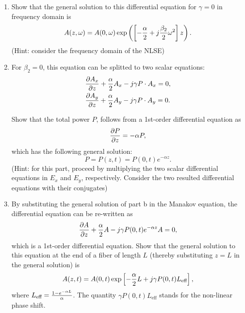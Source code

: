 \documentclass[10pt,letterpaper]{article}
\begin{document}
\begin{enumerate}[label=\alph*.]
\item
Show that the general solution to this differential equation for $\gamma=0$ in frequency domain is
$$
A(z,\omega)=A(0,\omega)\exp\left(\left[-{\alpha\over 2}+j{\beta_2\over 2}\omega^2\right]z\right)
.
$$
(Hint: consider the frequency domain of the NLSE)
\item
For $\beta_2=0$, this equation can be splitted to two scalar equations:
\[\begin{split}
&
{\partial A_x\over \partial z}+{\alpha\over 2}A_x-j\gamma P\cdot A_x=0
,
\\&
{\partial A_y\over \partial z}+{\alpha\over 2}A_y-j\gamma P\cdot A_y=0
.
\end{split}\]

Show that the total power $P$, follows from a 1st-order differential equation as
$$
{\partial P\over \partial z}=-\alpha P
,
$$
which has the following general solution:
$$
P=P(z,t)=P(0,t)e^{-\alpha z}.
$$
(Hint: for this part, proceed  by multiplying the two scalar differential equations in $E_x$ and $E_y$, respectively. Consider the two resulted differential equations with their conjugates)
\item
By substituting the general solution of part b in the Manakov equation, the differential equation can be re-written as
$$
{\partial A\over \partial z}+{\alpha\over 2}A-j\gamma P(0,t)e^{-\alpha z} A=0
,
$$
which is a 1st-order differential equation. Show that the general solution to this equation at the end of a fiber of length $L$ (thereby substituting $z=L$ in the general solution) is
$$
A(z,t)=A(0,t)\exp\left[-{\alpha\over 2}L+j\gamma P(0,t)L_{\text{eff}}\right]
,
$$
where $L_{\text{eff}}={1-e^{-\alpha L}\over \alpha}$. The quantity $\gamma P(0,t)L_{\text{eff}}$ stands for the non-linear phase shift.
\end{enumerate}
\end{document}
